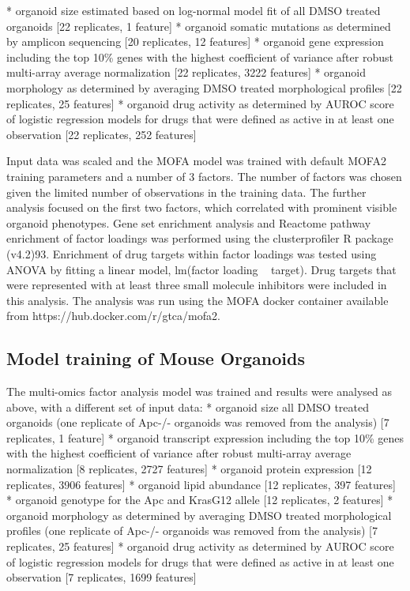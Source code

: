 \begin{flushleft}
* organoid size estimated based on log-normal model fit of all DMSO treated organoids [22 replicates, 1 feature]
* organoid somatic mutations as determined by amplicon sequencing [20 replicates, 12 features]
* organoid gene expression including the top 10\% genes with the highest coefficient of variance after robust multi-array average normalization [22 replicates, 3222 features]
* organoid morphology as determined by averaging DMSO treated morphological profiles [22 replicates, 25 features]
* organoid drug activity as determined by AUROC score of logistic regression models for drugs that were defined as active in at least one observation [22 replicates, 252 features]

Input data was scaled and the MOFA model was trained with default MOFA2 training parameters and a number of 3 factors. The number of factors was chosen given the limited number of observations in the training data. The further analysis focused on the first two factors, which correlated with prominent visible organoid phenotypes. Gene set enrichment analysis and Reactome pathway enrichment of factor loadings was performed using the clusterprofiler R package (v4.2)93. Enrichment of drug targets within factor loadings was tested using ANOVA by fitting a linear model, lm(factor loading ~ target). Drug targets that were represented with at least three small molecule inhibitors were included in this analysis. The analysis was run using the MOFA docker container available from https://hub.docker.com/r/gtca/mofa2.

\subsection{Model training of Mouse Organoids}
The multi-omics factor analysis model was trained and results were analysed as above, with a different set of input data: 
* organoid size all DMSO treated organoids (one replicate of Apc-/- organoids was removed from the analysis) [7 replicates, 1 feature]
* organoid transcript expression including the top 10\% genes with the highest coefficient of variance after robust multi-array average normalization [8 replicates, 2727 features]
* organoid protein expression [12 replicates, 3906 features]
* organoid lipid abundance [12 replicates, 397 features]
* organoid genotype for the Apc and KrasG12 allele [12 replicates, 2 features]
* organoid morphology as determined by averaging DMSO treated morphological profiles (one replicate of Apc-/- organoids was removed from the analysis) [7 replicates, 25 features]
* organoid drug activity as determined by AUROC score of logistic regression models for drugs that were defined as active in at least one observation [7 replicates, 1699 features]


\end{flushleft}
